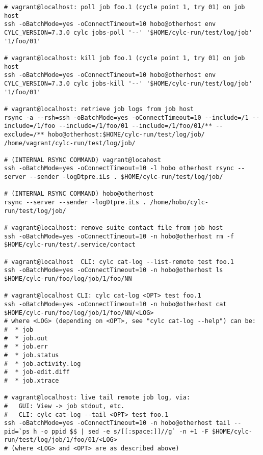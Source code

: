 \begin{lstlisting}
# vagrant@localhost: poll job foo.1 (cycle point 1, try 01) on job host
ssh -oBatchMode=yes -oConnectTimeout=10 hobo@otherhost env CYLC_VERSION=7.3.0 cylc jobs-poll '--' '$HOME/cylc-run/test/log/job' '1/foo/01'

# vagrant@localhost: kill job foo.1 (cycle point 1, try 01) on job host
ssh -oBatchMode=yes -oConnectTimeout=10 hobo@otherhost env CYLC_VERSION=7.3.0 cylc jobs-kill '--' '$HOME/cylc-run/test/log/job' '1/foo/01'

# vagrant@localhost: retrieve job logs from job host
rsync -a --rsh=ssh -oBatchMode=yes -oConnectTimeout=10 --include=/1 --include=/1/foo --include=/1/foo/01 --include=/1/foo/01/** --exclude=/** hobo@otherhost:$HOME/cylc-run/test/log/job/ /home/vagrant/cylc-run/test/log/job/

# (INTERNAL RSYNC COMMAND) vagrant@locahost
ssh -oBatchMode=yes -oConnectTimeout=10 -l hobo otherhost rsync --server --sender -logDtpre.iLs . $HOME/cylc-run/test/log/job/

# (INTERNAL RSYNC COMMAND) hobo@otherhost
rsync --server --sender -logDtpre.iLs . /home/hobo/cylc-run/test/log/job/

# vagrant@localhost: remove suite contact file from job host
ssh -oBatchMode=yes -oConnectTimeout=10 -n hobo@otherhost rm -f $HOME/cylc-run/test/.service/contact

# vagrant@localhost  CLI: cylc cat-log --list-remote test foo.1
ssh -oBatchMode=yes -oConnectTimeout=10 -n hobo@otherhost ls $HOME/cylc-run/foo/log/job/1/foo/NN

# vagrant@localhost CLI: cylc cat-log <OPT> test foo.1
ssh -oBatchMode=yes -oConnectTimeout=10 -n hobo@otherhost cat $HOME/cylc-run/foo/log/job/1/foo/NN/<LOG>
# where <LOG> (depending on <OPT>, see "cylc cat-log --help") can be:
#  * job
#  * job.out
#  * job.err
#  * job.status
#  * job.activity.log
#  * job-edit.diff
#  * job.xtrace

# vagrant@localhost: live tail remote job log, via:
#   GUI: View -> job stdout, etc.
#   CLI: cylc cat-log --tail <OPT> test foo.1
ssh -oBatchMode=yes -oConnectTimeout=10 -n hobo@otherhost tail --pid=`ps h -o ppid $$ | sed -e s/[[:space:]]//g` -n +1 -F $HOME/cylc-run/test/log/job/1/foo/01/<LOG>
# (where <LOG> and <OPT> are as described above)
\end{lstlisting}

